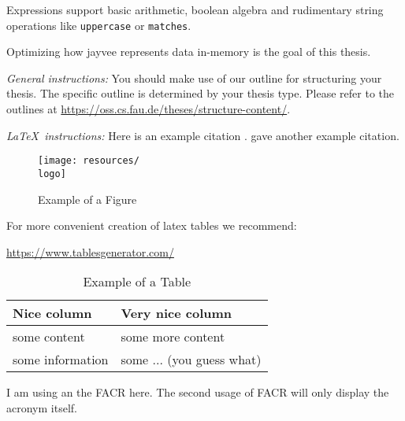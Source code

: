 Expressions support basic arithmetic, boolean algebra and rudimentary string operations like \Verb|uppercase| or \Verb|matches|.


Optimizing how jayvee represents data in-memory is the goal of this thesis.

	{\textsl{General instructions:}}
You should make use of our outline for structuring your
thesis. The specific outline is determined by your thesis type.
Please refer to the outlines at
\url{https://oss.cs.fau.de/theses/structure-content/}.

{\textsl{\LaTeX\ instructions:}} Here is an example citation
\autocite{riehle:2011:controlling}.
\textcite{riehle:2007:economic} gave another example citation.

\begin{figure}[ht]
	\texttt{[image: resources/\\logo]}
	\caption{Example of a Figure}
	\label{fig:example}
\end{figure}

For more convenient creation of latex tables we recommend:

\url{https://www.tablesgenerator.com/}

\begin{table}[ht]
	\caption{Example of a Table}
	\label{tab:example}
	\begin{tabular}{|l|l|}
		\hline
		Nice column      & Very nice column          \\
		\hline
		some content     & some more content         \\
		some information & some ... (you guess what) \\
		\hline
	\end{tabular}
\end{table}

I am using an the \ac{FACR} here. The second usage of \ac{FACR} will only display the acronym itself.
